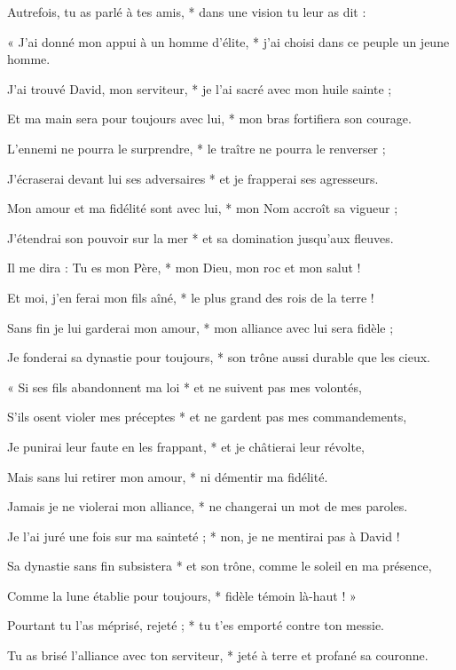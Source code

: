 \item Autrefois, tu as parlé à tes amis, * dans une vision tu leur as dit : 
\item « J'ai donné mon appui à un homme d'élite, * j'ai choisi dans ce peuple un jeune homme.
\item J'ai trouvé David, mon serviteur, * je l'ai sacré avec mon huile sainte ;
\item Et ma main sera pour toujours avec lui, * mon bras fortifiera son courage.
\item L'ennemi ne pourra le surprendre, * le traître ne pourra le renverser ;
\item J'écraserai devant lui ses adversaires * et je frapperai ses agresseurs.
\item Mon amour et ma fidélité sont avec lui, * mon Nom accroît sa vigueur ;
\item J'étendrai son pouvoir sur la mer * et sa domination jusqu'aux fleuves.
\item Il me dira : Tu es mon Père, * mon Dieu, mon roc et mon salut !
\item Et moi, j'en ferai mon fils aîné, * le plus grand des rois de la terre !
\item Sans fin je lui garderai mon amour, * mon alliance avec lui sera fidèle ;
\item Je fonderai sa dynastie pour toujours, * son trône aussi durable que les cieux.
\item « Si ses fils abandonnent ma loi * et ne suivent pas mes volontés,
\item S'ils osent violer mes préceptes * et ne gardent pas mes commandements,
\item Je punirai leur faute en les frappant, * et je châtierai leur révolte,
\item Mais sans lui retirer mon amour, * ni démentir ma fidélité.
\item Jamais je ne violerai mon alliance, * ne changerai un mot de mes paroles.
\item Je l'ai juré une fois sur ma sainteté ; * non, je ne mentirai pas à David !
\item Sa dynastie sans fin subsistera * et son trône, comme le soleil en ma présence,
\item Comme la lune établie pour toujours, * fidèle témoin là-haut ! »
\item Pourtant tu l'as méprisé, rejeté ; * tu t'es emporté contre ton messie.
\item Tu as brisé l'alliance avec ton serviteur, * jeté à terre et profané sa couronne.
